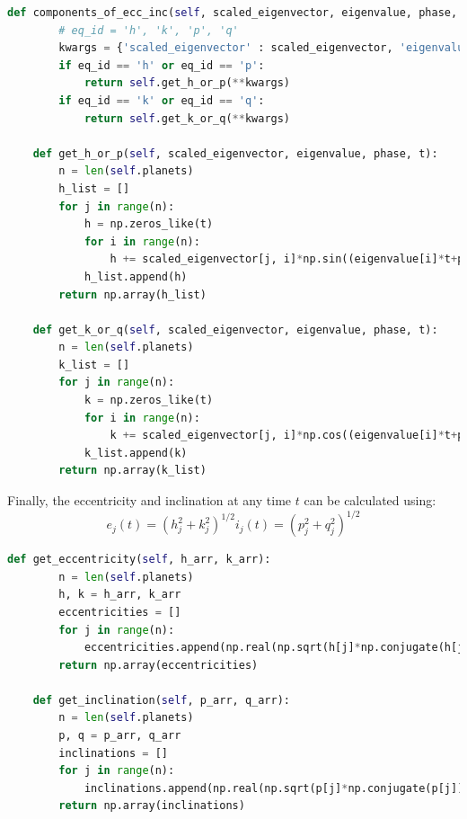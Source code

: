 \documentclass[11pt, oneside]{article}   	%
\begin{document}
\begin{lstlisting}[language=Python, caption={Calculating the vertical and horizontal components of the eccentricity and inclination}, firstnumber=103]
    def components_of_ecc_inc(self, scaled_eigenvector, eigenvalue, phase, t, eq_id):
        # eq_id = 'h', 'k', 'p', 'q'
        kwargs = {'scaled_eigenvector' : scaled_eigenvector, 'eigenvalue' : eigenvalue, 'phase' : phase, 't' : t}
        if eq_id == 'h' or eq_id == 'p':
            return self.get_h_or_p(**kwargs)
        if eq_id == 'k' or eq_id == 'q':
            return self.get_k_or_q(**kwargs)
    
    def get_h_or_p(self, scaled_eigenvector, eigenvalue, phase, t):
        n = len(self.planets)
        h_list = []
        for j in range(n):
            h = np.zeros_like(t)
            for i in range(n):
                h += scaled_eigenvector[j, i]*np.sin((eigenvalue[i]*t+phase[i])*np.pi/180)
            h_list.append(h)
        return np.array(h_list)

    def get_k_or_q(self, scaled_eigenvector, eigenvalue, phase, t):
        n = len(self.planets)
        k_list = []
        for j in range(n):
            k = np.zeros_like(t)
            for i in range(n):
                k += scaled_eigenvector[j, i]*np.cos((eigenvalue[i]*t+phase[i])*np.pi/180)
            k_list.append(k)
        return np.array(k_list)
\end{lstlisting}

Finally, the eccentricity and inclination at any time $t$ can be calculated using:
\begin{subequations}
   \begin{equation}
   e_{j} (t) = \left (h_{j}^{2} + k_{j}^{2} \right)^{1/2}
   \end{equation}
   \begin{equation}
   i_{j} (t) = \left (p_{j}^{2} + q_{j}^{2} \right)^{1/2}
   \end{equation}
\end{subequations}
\begin{lstlisting}[language=Python, caption={Calculating the eccentricity and inclination}, firstnumber=131]
    def get_eccentricity(self, h_arr, k_arr):
        n = len(self.planets)
        h, k = h_arr, k_arr
        eccentricities = []
        for j in range(n):  
            eccentricities.append(np.real(np.sqrt(h[j]*np.conjugate(h[j])+k[j]*np.conjugate(k[j]))))
        return np.array(eccentricities)

    def get_inclination(self, p_arr, q_arr):
        n = len(self.planets)
        p, q = p_arr, q_arr
        inclinations = []
        for j in range(n):  
            inclinations.append(np.real(np.sqrt(p[j]*np.conjugate(p[j])+q[j]*np.conjugate(q[j]))))
        return np.array(inclinations)
\end{lstlisting}
\end{document}
